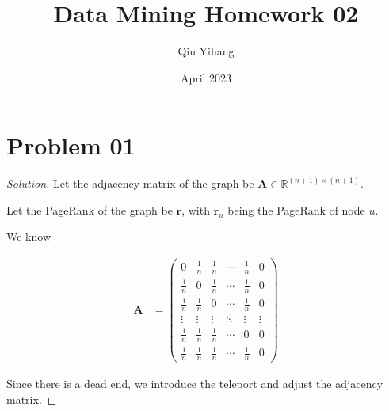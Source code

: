 \documentclass{article}
\title{\textbf{Data Mining Homework 02}}
\author{Qiu Yihang}
\date{April 2023}
\newenvironment{solution}{\begin{proof}[\noindent\it Solution]}{\end{proof}}
\newcommand{\bd}[1]{\boldsymbol{#1}}
\begin{document}
\maketitle

\vspace{3em}
\section{Problem 01}
\vspace{1em}
\begin{solution}
    Let the adjacency matrix of the graph be $\bd{A}\in\mathbb{R}^{(n+1)\times(n+1)}$.
    
    \hspace{2.6em}
    Let the PageRank of the graph be $\bd{r}$, with $\bd{r}_u$ being the PageRank of node $u$.

    \hspace{2.6em}
    We know

    \vspace{-2em}
    \begin{align*}
        \bd{A} &= \left(
            \begin{array}{cccccc}
                0 & \frac{1}{n} & \frac{1}{n} & \cdots & \frac{1}{n} & 0 \\
                \frac{1}{n} & 0 & \frac{1}{n} & \cdots & \frac{1}{n} & 0 \\
                \frac{1}{n} & \frac{1}{n} & 0 & \cdots & \frac{1}{n} & 0 \\
                \vdots & \vdots & \vdots & \ddots & \vdots & \vdots \\
                \frac{1}{n} & \frac{1}{n} & \frac{1}{n} & \cdots & 0 & 0 \\
                \frac{1}{n} & \frac{1}{n} & \frac{1}{n} & \cdots & \frac{1}{n} & 0
            \end{array}
        \right) 
    \end{align*}

    \hspace{2.6em}
    Since there is a dead end, we introduce the teleport and adjust the adjacency matrix.


\end{solution}
\end{document}
